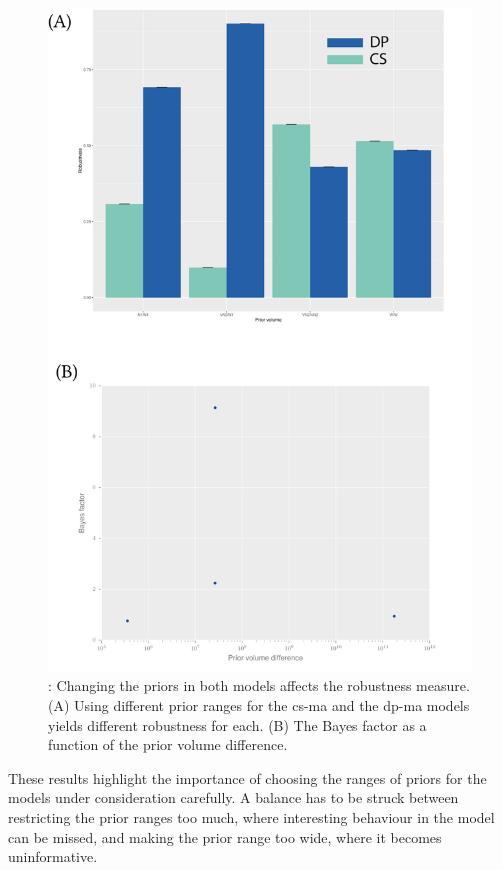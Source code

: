 \begin{figure}[h]
\begin{center}
\includegraphics[scale=0.7]{../../chapters/chapterStabilityFinder/images/priors_matter_2.png}
\caption[Changing the priors in both models affects the robustness measure.]{ \label{fig:priors_matter2}: Changing the priors in both models affects the robustness measure. (A) Using different prior ranges for the \acrshort{cs-ma} and the \acrshort{dp-ma} models yields different robustness for each. (B) The Bayes factor as a function of the prior volume difference. }
\end{center}
\end{figure}

These results highlight the importance of choosing the ranges of priors for the models under consideration carefully. A balance has to be struck between restricting the prior ranges too much, where interesting behaviour in the model can be missed, and making the prior range too wide, where it becomes uninformative. 


